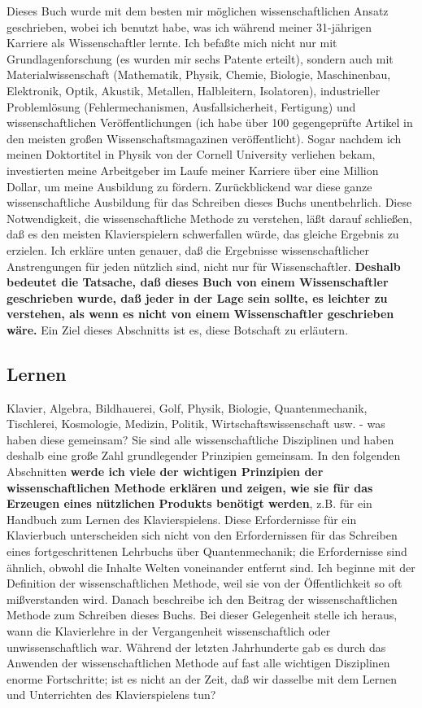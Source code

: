 Dieses Buch wurde mit dem besten mir möglichen wissenschaftlichen Ansatz geschrieben, wobei ich benutzt habe, was ich während meiner 31-jährigen Karriere als Wissenschaftler lernte.
Ich befaßte mich nicht nur mit Grundlagenforschung (es wurden mir sechs Patente erteilt), sondern auch mit Materialwissenschaft (Mathematik, Physik, Chemie, Biologie, Maschinenbau, Elektronik, Optik, Akustik, Metallen, Halbleitern, Isolatoren), industrieller Problemlösung (Fehlermechanismen, Ausfallsicherheit, Fertigung) und wissenschaftlichen Veröffentlichungen (ich habe über 100 gegengeprüfte Artikel in den meisten großen Wissenschaftsmagazinen veröffentlicht).
Sogar nachdem ich meinen Doktortitel in Physik von der Cornell University verliehen bekam, investierten meine Arbeitgeber im Laufe meiner Karriere über eine Million Dollar, um meine Ausbildung zu fördern.
Zurückblickend war diese ganze wissenschaftliche Ausbildung für das Schreiben dieses Buchs unentbehrlich.
Diese Notwendigkeit, die wissenschaftliche Methode zu verstehen, läßt darauf schließen, daß es den meisten Klavierspielern schwerfallen würde, das gleiche Ergebnis zu erzielen.
Ich erkläre unten genauer, daß die Ergebnisse wissenschaftlicher Anstrengungen für jeden nützlich sind, nicht nur für Wissenschaftler.
\textbf{Deshalb bedeutet die Tatsache, daß dieses Buch von einem Wissenschaftler geschrieben wurde, daß jeder in der Lage sein sollte, es leichter zu verstehen, als wenn es nicht von einem Wissenschaftler geschrieben wäre.}
Ein Ziel dieses Abschnitts ist es, diese Botschaft zu erläutern.


\subsection{Lernen}
\label{c3_2b}

Klavier, Algebra, Bildhauerei, Golf, Physik, Biologie, Quantenmechanik, Tischlerei, Kosmologie, Medizin, Politik, Wirtschaftswissenschaft usw. - was haben diese gemeinsam?
Sie sind alle wissenschaftliche Disziplinen und haben deshalb eine große Zahl grundlegender Prinzipien gemeinsam.
In den folgenden Abschnitten \textbf{werde ich viele der wichtigen Prinzipien der wissenschaftlichen Methode erklären und zeigen, wie sie für das Erzeugen eines nützlichen Produkts benötigt werden}, z.B. für ein Handbuch zum Lernen des Klavierspielens.
Diese Erfordernisse für ein Klavierbuch unterscheiden sich nicht von den Erfordernissen für das Schreiben eines fortgeschrittenen Lehrbuchs über Quantenmechanik; die Erfordernisse sind ähnlich, obwohl die Inhalte Welten voneinander entfernt sind.
Ich beginne mit der Definition der wissenschaftlichen Methode, weil sie von der Öffentlichkeit so oft mißverstanden wird.
Danach beschreibe ich den Beitrag der wissenschaftlichen Methode zum Schreiben dieses Buchs.
Bei dieser Gelegenheit stelle ich heraus, wann die Klavierlehre in der Vergangenheit wissenschaftlich oder unwissenschaftlich war.
Während der letzten Jahrhunderte gab es durch das Anwenden der wissenschaftlichen Methode auf fast alle wichtigen Disziplinen enorme Fortschritte; ist es nicht an der Zeit, daß wir dasselbe mit dem Lernen und Unterrichten des Klavierspielens tun?

